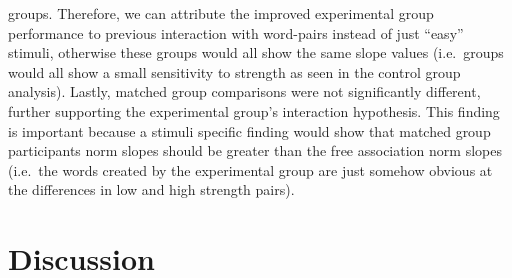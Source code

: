 \documentclass[english,man]{apa6}
\theoremstyle{definition}
\theoremstyle{definition}
\theoremstyle{definition}
\theoremstyle{remark}
\begin{document}
groups. Therefore, we can attribute the improved experimental group
performance to previous interaction with word-pairs instead of just
\enquote{easy} stimuli, otherwise these groups would all show the same
slope values (i.e.~groups would all show a small sensitivity to strength
as seen in the control group analysis). Lastly, matched group
comparisons were not significantly different, further supporting the
experimental group's interaction hypothesis. This finding is important
because a stimuli specific finding would show that matched group
participants norm slopes should be greater than the free association
norm slopes (i.e.~the words created by the experimental group are just
somehow obvious at the differences in low and high strength pairs).

\section{Discussion}\label{discussion}
\end{document}
